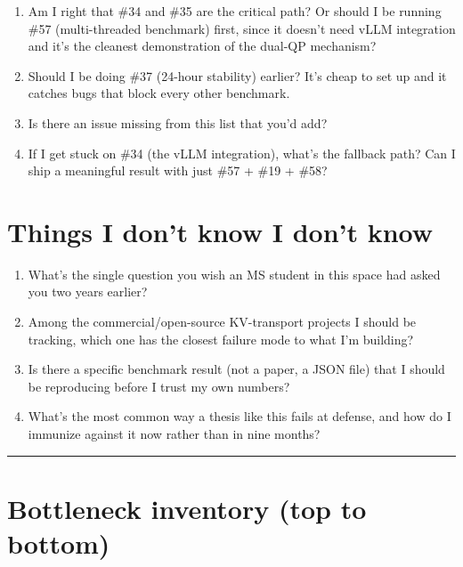 \documentclass[11pt]{article}
\begin{document}
\begin{enumerate}[resume]
\item Am I right that \#34 and \#35 are the critical path? Or should
I be running \#57 (multi-threaded benchmark) first, since it doesn't
need vLLM integration and it's the cleanest demonstration of the
dual-QP mechanism?

\item Should I be doing \#37 (24-hour stability) earlier? It's cheap
to set up and it catches bugs that block every other benchmark.

\item Is there an issue missing from this list that you'd add?

\item If I get stuck on \#34 (the vLLM integration), what's the
fallback path? Can I ship a meaningful result with just \#57 +
\#19 + \#58?
\end{enumerate}

\section{Things I don't know I don't know}

\begin{enumerate}
\item What's the single question you wish an MS student in this
space had asked you two years earlier?

\item Among the commercial/open-source KV-transport projects I should
be tracking, which one has the closest failure mode to what I'm
building?

\item Is there a specific benchmark result (not a paper, a JSON file)
that I should be reproducing before I trust my own numbers?

\item What's the most common way a thesis like this fails at defense,
and how do I immunize against it now rather than in nine months?
\end{enumerate}

\vspace{8pt}
\hrule
\vspace{6pt}

\section{Bottleneck inventory (top to bottom)}
\end{document}
